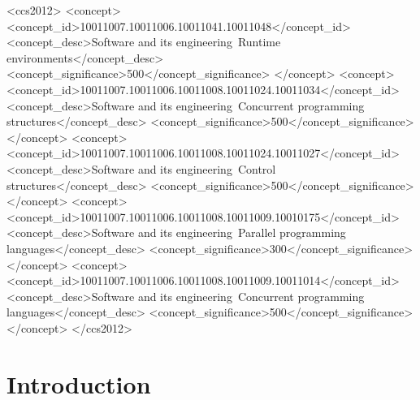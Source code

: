 \documentclass[sigplan,screen]{acmart}
\begin{document}
\begin{CCSXML}
<ccs2012>
   <concept>
       <concept_id>10011007.10011006.10011041.10011048</concept_id>
       <concept_desc>Software and its engineering~Runtime environments</concept_desc>
       <concept_significance>500</concept_significance>
       </concept>
   <concept>
       <concept_id>10011007.10011006.10011008.10011024.10011034</concept_id>
       <concept_desc>Software and its engineering~Concurrent programming structures</concept_desc>
       <concept_significance>500</concept_significance>
       </concept>
   <concept>
       <concept_id>10011007.10011006.10011008.10011024.10011027</concept_id>
       <concept_desc>Software and its engineering~Control structures</concept_desc>
       <concept_significance>500</concept_significance>
       </concept>
   <concept>
       <concept_id>10011007.10011006.10011008.10011009.10010175</concept_id>
       <concept_desc>Software and its engineering~Parallel programming languages</concept_desc>
       <concept_significance>300</concept_significance>
       </concept>
   <concept>
       <concept_id>10011007.10011006.10011008.10011009.10011014</concept_id>
       <concept_desc>Software and its engineering~Concurrent programming languages</concept_desc>
       <concept_significance>500</concept_significance>
       </concept>
 </ccs2012>
\end{CCSXML}



\maketitle

\section{Introduction}
\end{document}
